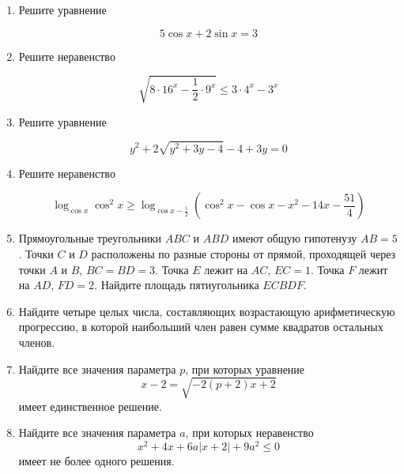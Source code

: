\documentclass[11pt,a5paper]{report}
\begin{document}
\begin{enumerate}

\item Решите уравнение

$$5\cos x + 2\sin x = 3$$

\item Решите неравенство

$$\sqrt{8\cdot 16^x-\frac{1}{2}\cdot 9^x} \leqslant 3\cdot 4^x-3^x$$

\item Решите уравнение

$$y^2+2\sqrt{y^2+3y-4}-4+3y=0$$

\item Решите неравенство

$$\log_{\cos x}\cos^2 x \geqslant \log_{\cos x-\frac{1}{2}}\left(\cos^2 x-\cos x-x^2-14x-\frac{51}{4}\right)$$

\item Прямоугольные треугольники $ABC$ и $ABD$ имеют общую гипотенузу $AB=5$. Точки $C$ и $D$ расположены по разные стороны от прямой, проходящей через точки $A$ и $B$, $BC=BD=3$. Точка $E$ лежит на $AC$, $EC=1$. Точка $F$ лежит на $AD$, $FD=2$. Найдите площадь пятиугольника $ECBDF$.

\item Найдите четыре целых числа, составляющих возрастающую арифметическую прогрессию, в которой наибольший член равен сумме квадратов остальных членов.

\item Найдите все значения параметра $p$, при которых уравнение $$x-2=\sqrt{-2(p+2)x+2}$$ имеет единственное решение.

\item Найдите все значения параметра $a$, при которых неравенство $$x^2+4x+6a|x+2|+9a^2\leqslant 0$$ имеет не более одного решения.

\end{enumerate}

\newpage
\end{document}

